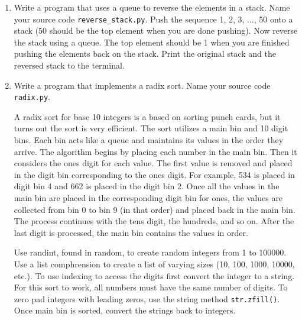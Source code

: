 \documentclass[12pt]{article}
\begin{document}
\begin{enumerate}
\item Write a program that uses a queue to reverse the elements in a stack. Name your source code \texttt{reverse\_stack.py}. Push the sequence 1, 2, 3,
..., 50 onto a stack (50 should be the top element when you are done pushing). Now
reverse the stack using a queue. The top element should be 1 when you
are finished pushing the elements back on the
stack. Print the original stack and the reversed stack to the terminal.

\item Write a program that implements a radix sort. Name your source code \texttt{radix.py}.

A radix sort for base 10 integers is a based on sorting punch cards, but it turns out the sort is very efficient. The sort utilizes a main bin and 10 digit bins. Each bin acts like a queue and maintains its values in the order they arrive. The algorithm begins by placing each number in the main bin. Then it considers the ones digit for each value. The first value is removed and placed in the digit bin corresponding to the ones digit. For example, 534 is placed in digit bin 4 and 662 is placed in the digit bin 2. Once all the values in the main bin are placed in the corresponding digit bin for ones, the values are collected from bin 0 to bin 9 (in that order) and placed back in the main bin. The process continues with the tens digit, the hundreds, and so on. After the last digit is processed, the main bin contains the values in order. 

Use randint, found in random, to create random integers from 1 to 100000. Use a list comphrension to create a list of varying sizes (10, 100, 1000, 10000, etc.). To use indexing to access the digits first convert the integer to a string. For this sort to work, all numbers must have the same number of digits. To zero pad integers with leading zeros, use the string method \texttt{str.zfill()}. Once main bin is sorted, convert the strings back to integers.  
 

\end{enumerate}




\end{document}
